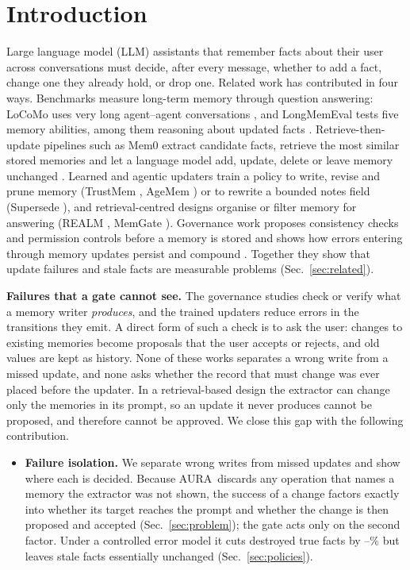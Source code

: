 \IfFileExists{IEEEtran.cls}{\documentclass[journal]{IEEEtran}\def\HAVEIEEE{1}}{\documentclass[10pt,twocolumn]{article}\usepackage[margin=0.7in,columnsep=0.25in]{geometry}}
\newcommand{\aura}{AURA}
\begin{document}
\section{Introduction}
Large language model (LLM) assistants that remember facts about their user across conversations must decide, after every message, whether to add a fact, change one they already hold, or drop one. Related work has contributed in four ways. Benchmarks measure long-term memory through question answering: LoCoMo uses very long agent--agent conversations \cite{maharana2024locomo}, and LongMemEval tests five memory abilities, among them reasoning about updated facts \cite{wu2024longmemeval}. Retrieve-then-update pipelines such as Mem0 extract candidate facts, retrieve the most similar stored memories and let a language model add, update, delete or leave memory unchanged \cite{chhikara2025mem0}. Learned and agentic updaters train a policy to write, revise and prune memory (TrustMem \cite{yang2026trustmem}, AgeMem \cite{yu2026agemem}) or to rewrite a bounded notes field (Supersede \cite{patel2026supersede}), and retrieval-centred designs organise or filter memory for answering (REALM \cite{song2026realm}, MemGate \cite{zhang2026memgate}). Governance work proposes consistency checks and permission controls before a memory is stored \cite{lam2026ssgm} and shows how errors entering through memory updates persist and compound \cite{xiong2025memory,xiao2026errors}. Together they show that update failures and stale facts are measurable problems (Sec.~\ref{sec:related}).

\textbf{Failures that a gate cannot see.} The governance studies check or verify what a memory writer \emph{produces}, and the trained updaters reduce errors in the transitions they emit. A direct form of such a check is to ask the user: changes to existing memories become proposals that the user accepts or rejects, and old values are kept as history. None of these works separates a wrong write from a missed update, and none asks whether the record that must change was ever placed before the updater. In a retrieval-based design the extractor can change only the memories in its prompt, so an update it never produces cannot be proposed, and therefore cannot be approved. We close this gap with the following contribution.
\begin{itemize}
\item \textbf{Failure isolation.} We separate wrong writes from missed updates and show where each is decided. Because \aura\ discards any operation that names a memory the extractor was not shown, the success of a change factors exactly into whether its target reaches the prompt and whether the change is then proposed and accepted (Sec.~\ref{sec:problem}); the gate acts only on the second factor. Under a controlled error model it cuts destroyed true facts by \destroyRedMin--\destroyRedMax\% but leaves stale facts essentially unchanged (Sec.~\ref{sec:policies}).
\end{itemize}
\end{document}
